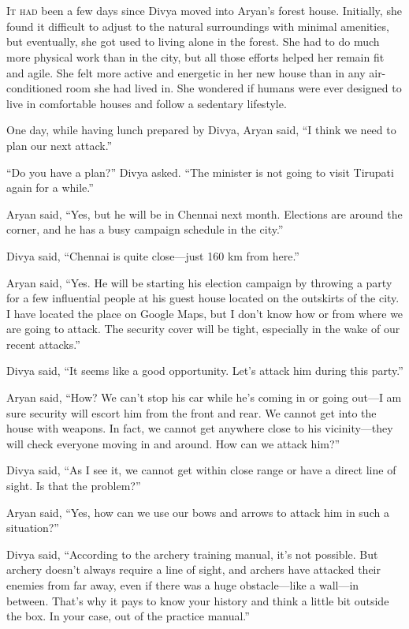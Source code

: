 \chapter{}

\lettrine{I}{t had} been a few days since Divya moved into Aryan's forest 
house. Initially, she found it difficult to adjust to the natural surroundings
with minimal amenities, but eventually, she got used to living alone in the
forest. She had to do much more physical work than in the city, but all those
efforts helped her remain fit and agile. She felt more active and energetic
in her new house than in any air-conditioned room she had lived in. She wondered
if humans were ever designed to live in comfortable houses and follow a
sedentary lifestyle.

One day, while having lunch prepared by Divya, Aryan said, “I think we need to plan
our next attack.”

“Do you have a plan?” Divya asked. “The minister is not going to visit
Tirupati again for a while.”

Aryan said, “Yes, but he will be in Chennai next month. Elections
are around the corner, and he has a busy campaign schedule in the city.”

Divya said, “Chennai is quite close—just 160 km from here.”

Aryan said, “Yes. He will be starting his election campaign by throwing a party
for a few influential people at his guest house located on the outskirts of the
city. I have located the place on Google Maps, but I don't know how or from
where we are going to attack. The security cover will be tight, especially in
the wake of our recent attacks.”

Divya said, “It seems like a good opportunity. Let's attack him during this party.”

Aryan said, “How? We can't stop his car while he's coming in or going out—I am sure
security will escort him from the front and rear. We cannot get into the house
with weapons. In fact, we cannot get anywhere close to his vicinity—they will
check everyone moving in and around. How can we attack him?”

Divya said, “As I see it, we cannot get within close range or have a direct line of
sight. Is that the problem?”

Aryan said, “Yes, how can we use our bows and arrows to attack him in such a
situation?”

Divya said, “According to the archery training manual, it's not possible. But
archery doesn't always require a line of sight, and archers have attacked their
enemies from far away, even if there was a huge obstacle—like a wall—in
between. That's why it pays to know your history and think a little bit outside
the box. In your case, out of the practice manual.”

